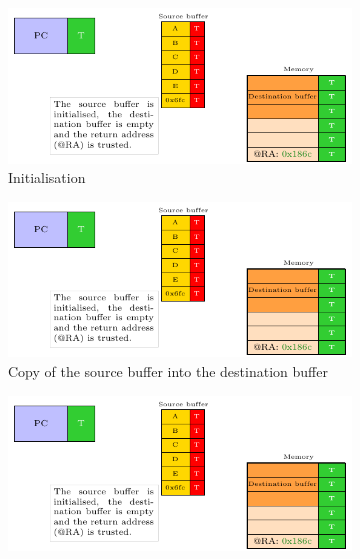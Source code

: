 \begin{figure}[ht]
    \centering
    \begin{subfigure}[b]{0.49\textwidth}
        \includegraphics[width=\textwidth, page=1]{c3_vulnerabilities_assessment/img/buffer_overflow/schemaPedagogique.pdf}
        \caption{Initialisation}
        \label{fig:rop_attack_1}
    \end{subfigure}
    \hfill
    \begin{subfigure}[b]{0.49\textwidth}
        \includegraphics[width=\textwidth, page=2]{c3_vulnerabilities_assessment/img/buffer_overflow/schemaPedagogique.pdf}
        \caption{Copy of the source buffer into the destination buffer}
        \label{fig:rop_attack_2}
    \end{subfigure}
    \hfill
    \begin{subfigure}[b]{0.49\textwidth}
        \includegraphics[width=\textwidth, page=3]{c3_vulnerabilities_assessment/img/buffer_overflow/schemaPedagogique.pdf}

\end{subfigure}
\end{figure}

